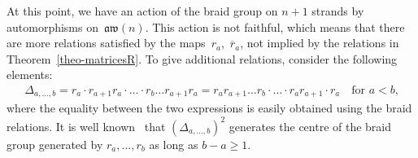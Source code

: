 \documentclass[pdftex]{sigma}
\numberwithin{equation}{section}
\theoremstyle{definition}
\newcommand{\rb}{\overline{r}}
\newcommand{\aw}{\mathfrak{aw}(n)}
\begin{document}
At this point, we have an action of the braid group on $n+1$ strands by automorphisms on~$\aw$. This action is not faithful, which means that there are more relations satisfied by the maps~$r_a$,~$\rb_a$, not implied by the relations in Theorem~\ref{theo-matricesR}. To give additional relations, consider the following elements:
\begin{gather}\label{def-Delta}
\Delta_{a,\dots,b}=r_a\cdot r_{a+1}r_a\cdot \ldots \cdot r_{b}\ldots r_{a+1}r_a=r_ar_{a+1}\ldots r_{b}\cdot\ldots\cdot r_a r_{a+1}\cdot r_a \quad \text{for $a<b$,}
\end{gather}
where the equality between the two expressions is easily obtained using the braid relations. It is well known~\cite{KT} that $(\Delta_{a,\dots,b})^2$ generates
the centre of the braid group generated by $r_{a},\ldots, r_{b}$ as long as $b-a\geq 1$.
\end{document}
